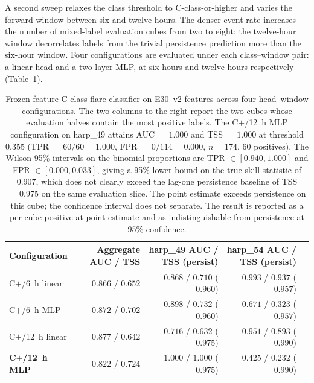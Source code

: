 A second sweep relaxes the class threshold to C-class-or-higher
and varies the forward window between six and twelve hours. The
denser event rate increases the number of mixed-label evaluation
cubes from two to eight; the twelve-hour window decorrelates
labels from the trivial persistence prediction more than the
six-hour window. Four configurations are evaluated under each
class--window pair: a linear head and a two-layer MLP, at six
hours and twelve hours respectively
(Table~\ref{tab:flare-cplus}).

\begin{table}[htbp]
\centering
\small
\begin{tabular}{lrrrr}
\toprule
Configuration & Aggregate AUC / TSS & harp\_49 AUC / TSS (persist) & harp\_54 AUC / TSS (persist) \\
\midrule
C$+$/6~h linear  & $0.866$ / $0.652$ & $0.868$ / $0.710$  ($0.960$) & $\mathbf{0.993}$ / $0.937$ ($0.957$) \\
C$+$/6~h MLP     & $0.872$ / $0.702$ & $0.898$ / $0.732$  ($0.960$) & $0.671$ / $0.323$ ($0.957$) \\
C$+$/12~h linear & $0.877$ / $0.642$ & $0.716$ / $0.632$  ($0.975$) & $0.951$ / $0.893$ ($0.990$) \\
\textbf{C$+$/12~h MLP} & $0.822$ / $\mathbf{0.724}$ & $\mathbf{1.000}$ / $\mathbf{1.000}$ ($0.975$) & $0.425$ / $0.232$ ($0.990$) \\
\bottomrule
\end{tabular}
\caption{Frozen-feature C-class flare classifier on E30~v2 features
across four head--window configurations. The two columns to the
right report the two cubes whose evaluation halves contain the
most positive labels. The C$+$/12~h MLP configuration on
harp\_49 attains AUC $= 1.000$ and TSS $= 1.000$ at threshold
$0.355$ (TPR $= 60/60 = 1.000$, FPR $= 0/114 = 0.000$,
$n = 174$, $60$ positives). The Wilson 95\% intervals on the
binomial proportions are TPR $\in [0.940, 1.000]$ and FPR
$\in [0.000, 0.033]$, giving a 95\% lower bound on the true skill
statistic of $0.907$, which does not clearly exceed the
lag-one persistence baseline of TSS $= 0.975$ on the same
evaluation slice. The point estimate exceeds persistence on this
cube; the confidence interval does not separate. The result is
reported as a per-cube positive at point estimate and as
indistinguishable from persistence at 95\% confidence.}
\label{tab:flare-cplus}
\end{table}

